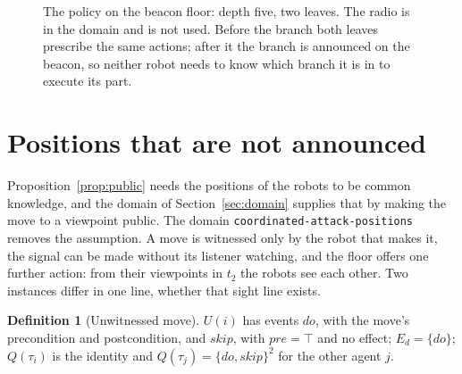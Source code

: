 \documentclass[11pt,a4paper]{article}
\theoremstyle{definition}
\newtheorem{definition}{Definition}
\newcommand{\Eop}[1]{E_{#1}}
\newcommand{\Cop}[1]{C_{#1}}
\newcommand{\code}[1]{\texttt{\small #1}}
\newcommand{\pre}{\mathit{pre}}
\begin{document}
\begin{figure}[H]
\centering
{}
\caption{The policy on the beacon floor: depth five, two leaves. The radio is
in the domain and is not used. Before the branch both leaves prescribe the same
actions; after it the branch is announced on the beacon, so neither robot needs
to know which branch it is in to execute its part.}
\label{fig:policy}
\end{figure}

\section{Positions that are not announced}
\label{sec:positions}

Proposition~\ref{prop:public} needs the positions of the robots to be common
knowledge, and the domain of Section~\ref{sec:domain} supplies that by making
the move to a viewpoint public. The domain
\code{coordinated-attack-}\allowbreak\code{positions} removes the assumption. A move is witnessed only by the robot that makes it,
the signal can be made without its listener watching, and the floor offers one
further action: from their viewpoints in $t_2$ the robots see each other. Two
instances differ in one line, whether that sight line exists.

\begin{definition}[Unwitnessed move]
$U(i)$ has events $do$, with the move's precondition and postcondition, and
$skip$, with $\pre = \top$ and no effect; $E_d = \{do\}$; $Q(\tau_i)$ is the
identity and $Q(\tau_j) = \{do, skip\}^2$ for the other agent $j$.
\end{definition}
\end{document}
